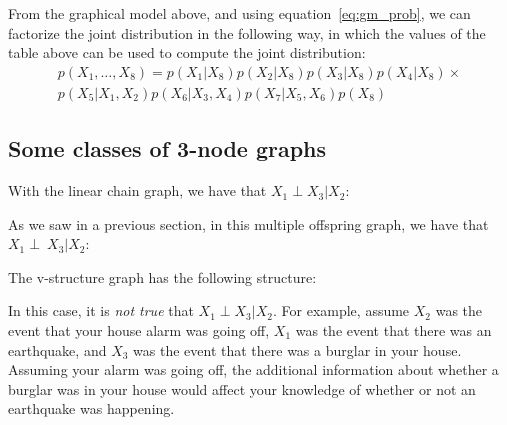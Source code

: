 \documentclass[12pt]{report}
\begin{document}
From the graphical model above, and using equation~\ref{eq:gm_prob},
we can factorize the joint distribution in the following way, in which
the values of the table above can be used to compute the joint distribution:
\begin{align*}
p(X_1,\ldots,X_8) = p(X_1|X_8)p(X_2|X_8)p(X_3|X_8)p(X_4|X_8)\times \\p(X_5|X_1,X_2)p(X_6|X_3,X_4)p(X_7|X_5,X_6)p(X_8)
\end{align*}



\subsection{Some classes of 3-node graphs}

With the linear chain graph, we have that $X_1 \perp X_3 | X_2$:

\begin{center}
\end{center}

As we saw in a previous section, in this multiple offspring graph, we
have that $X_1 \perp~ X_3 | X_2$:

\begin{center}
\end{center}

The v-structure graph has the following structure:
\begin{center}
\end{center}
In this case, it is \emph{not true} that $X_1 \perp X_3 | X_2$. For example, assume
$X_2$ was the event that your house alarm was going off, $X_1$ was the
event that there was an earthquake, and $X_3$ was the event that there
was a burglar in your house. Assuming your alarm was going off, the
additional information about whether a burglar was in your house would
affect your knowledge of whether or not an earthquake was
happening.
\end{document}
